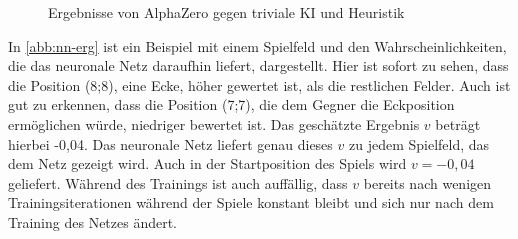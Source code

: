 \documentclass[12pt,a4paper,bibliography=totocnumbered,listof=totocnumbered]{article}
\begin{document}
\begin{figure} [h]
\centering
{}
\caption{Ergebnisse von AlphaZero gegen triviale KI und Heuristik}
\label{abb:win_neuralnet}
\end{figure}

In \autoref{abb:nn-erg} ist ein Beispiel mit einem Spielfeld und den Wahrscheinlichkeiten, die das neuronale Netz daraufhin liefert, dargestellt. Hier ist sofort zu sehen, dass die Position (8;8), eine Ecke, höher gewertet ist, als die restlichen Felder. Auch ist gut zu erkennen, dass die Position (7;7), die dem Gegner die Eckposition ermöglichen würde, niedriger bewertet ist. Das geschätzte Ergebnis $v$ beträgt hierbei -0,04. Das neuronale Netz liefert genau dieses $v$ zu jedem Spielfeld, das dem Netz gezeigt wird. Auch in der Startposition des Spiels wird $v=-0,04$ geliefert. Während des Trainings ist auch auffällig, dass $v$ bereits nach wenigen Trainingsiterationen während der Spiele konstant bleibt und sich nur nach dem Training des Netzes ändert.\\
\end{document}
